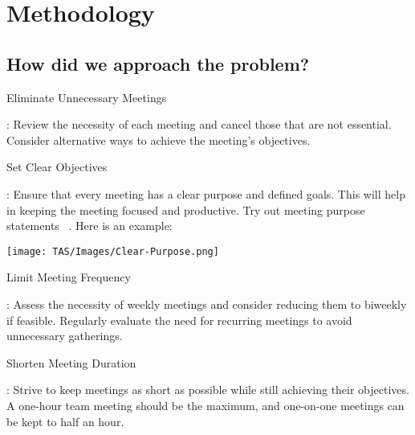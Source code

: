 \section{Methodology}
\subsection{How did we approach the problem?}
\begin{enumerate}
{\bfseries \item Eliminate Unnecessary Meetings}: Review the necessity of each meeting and cancel those that are not essential. Consider alternative ways to achieve the meeting's objectives.
{\bfseries \item Set Clear Objectives}: Ensure that every meeting has a clear purpose and defined goals. This will help in keeping the meeting focused and productive. Try out meeting purpose statements ~\cite{17}. Here is an example:
\begin{center}
    \texttt{[image: TAS/Images/Clear-Purpose.png]}\\
\end{center}
{\bfseries \item Limit Meeting Frequency}: Assess the necessity of weekly meetings and consider reducing them to biweekly if feasible. Regularly evaluate the need for recurring meetings to avoid unnecessary gatherings.
{\bfseries \item Shorten Meeting Duration}: Strive to keep meetings as short as possible while still achieving their objectives. A one-hour team meeting should be the maximum, and one-on-one meetings can be kept to half an hour.
\end{enumerate}
